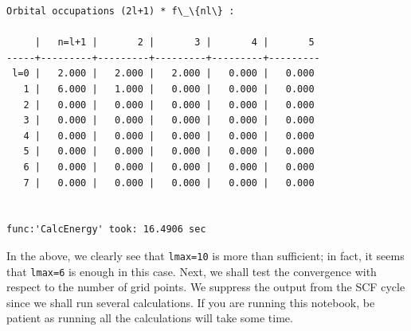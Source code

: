 \documentclass[preprint,aps]{revtex4-2}
\begin{document}
\begin{Verbatim}[commandchars=\\\{\}]
Orbital occupations (2l+1) * f\_\{nl\} :

     |   n=l+1 |       2 |       3 |       4 |       5
-----+---------+---------+---------+---------+---------
 l=0 |   2.000 |   2.000 |   2.000 |   0.000 |   0.000
   1 |   6.000 |   1.000 |   0.000 |   0.000 |   0.000
   2 |   0.000 |   0.000 |   0.000 |   0.000 |   0.000
   3 |   0.000 |   0.000 |   0.000 |   0.000 |   0.000
   4 |   0.000 |   0.000 |   0.000 |   0.000 |   0.000
   5 |   0.000 |   0.000 |   0.000 |   0.000 |   0.000
   6 |   0.000 |   0.000 |   0.000 |   0.000 |   0.000
   7 |   0.000 |   0.000 |   0.000 |   0.000 |   0.000


func:'CalcEnergy' took: 16.4906 sec
    \end{Verbatim}

    In the above, we clearly see that \texttt{lmax=10} is more than
sufficient; in fact, it seems that \texttt{lmax=6} is enough in this
case. Next, we shall test the convergence with respect to the number of
grid points. We suppress the output from the SCF cycle since we shall
run several calculations. If you are running this notebook, be patient
as running all the calculations will take some time.
\end{document}
